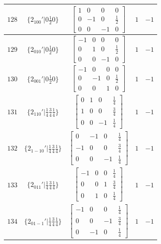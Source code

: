 \documentclass[fleqn,8pt]{jsarticle}
\begin{document}
\begin{longtable}{ccccc}
$ 128 $ & $ \{2{}_{100}{}'|0 \frac{1}{2} 0\} $ & $ \begin{bmatrix} 1 & 0 & 0 & 0 \\ 0 & -1 & 0 & \frac{1}{2} \\ 0 & 0 & -1 & 0 \end{bmatrix} $ & $ 1 $ & $ -1 $ \\ \hline
$ 129 $ & $ \{2{}_{010}{}'|0 \frac{1}{2} 0\} $ & $ \begin{bmatrix} -1 & 0 & 0 & 0 \\ 0 & 1 & 0 & \frac{1}{2} \\ 0 & 0 & -1 & 0 \end{bmatrix} $ & $ 1 $ & $ -1 $ \\ \hline
$ 130 $ & $ \{2{}_{001}{}'|0 \frac{1}{2} 0\} $ & $ \begin{bmatrix} -1 & 0 & 0 & 0 \\ 0 & -1 & 0 & \frac{1}{2} \\ 0 & 0 & 1 & 0 \end{bmatrix} $ & $ 1 $ & $ -1 $ \\ \hline
$ 131 $ & $ \{2{}_{110}{}'|\frac{1}{4} \frac{3}{4} \frac{1}{4}\} $ & $ \begin{bmatrix} 0 & 1 & 0 & \frac{1}{4} \\ 1 & 0 & 0 & \frac{3}{4} \\ 0 & 0 & -1 & \frac{1}{4} \end{bmatrix} $ & $ 1 $ & $ -1 $ \\ \hline
$ 132 $ & $ \{2{}_{1-10}{}'|\frac{1}{4} \frac{3}{4} \frac{1}{4}\} $ & $ \begin{bmatrix} 0 & -1 & 0 & \frac{1}{4} \\ -1 & 0 & 0 & \frac{3}{4} \\ 0 & 0 & -1 & \frac{1}{4} \end{bmatrix} $ & $ 1 $ & $ -1 $ \\ \hline
$ 133 $ & $ \{2{}_{011}{}'|\frac{1}{4} \frac{3}{4} \frac{1}{4}\} $ & $ \begin{bmatrix} -1 & 0 & 0 & \frac{1}{4} \\ 0 & 0 & 1 & \frac{3}{4} \\ 0 & 1 & 0 & \frac{1}{4} \end{bmatrix} $ & $ 1 $ & $ -1 $ \\ \hline
$ 134 $ & $ \{2{}_{01-1}{}'|\frac{1}{4} \frac{3}{4} \frac{1}{4}\} $ & $ \begin{bmatrix} -1 & 0 & 0 & \frac{1}{4} \\ 0 & 0 & -1 & \frac{3}{4} \\ 0 & -1 & 0 & \frac{1}{4} \end{bmatrix} $ & $ 1 $ & $ -1 $ \\ \hline

\end{longtable}
\end{document}
